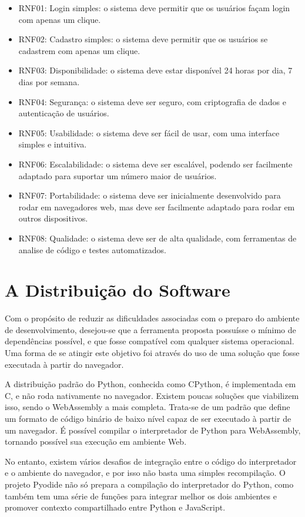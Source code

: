 \begin{itemize}
    \item RNF01: Login simples: o sistema deve permitir que os usuários façam login com apenas um clique.
    \item RNF02: Cadastro simples: o sistema deve permitir que os usuários se cadastrem com apenas um clique.
    \item RNF03: Disponibilidade: o sistema deve estar disponível 24 horas por dia, 7 dias por semana.
    \item RNF04: Segurança: o sistema deve ser seguro, com criptografia de dados e autenticação de usuários.
    \item RNF05: Usabilidade: o sistema deve ser fácil de usar, com uma interface simples e intuitiva.
    \item RNF06: Escalabilidade: o sistema deve ser escalável, podendo ser facilmente adaptado para suportar um número maior de usuários.
    \item RNF07: Portabilidade: o sistema deve ser inicialmente desenvolvido para rodar em navegadores web, mas deve ser facilmente adaptado para rodar em outros dispositivos.
    \item RNF08: Qualidade: o sistema deve ser de alta qualidade, com ferramentas de analise de código e testes automatizados.
\end{itemize}

\section{A Distribuição do Software}

Com o propósito de reduzir as dificuldades associadas com o preparo do ambiente de desenvolvimento, desejou-se que a ferramenta proposta possuísse o mínimo de dependências possível, e que fosse compatível com qualquer sistema operacional. Uma forma de se atingir este objetivo foi através do uso de uma solução que fosse executada à partir do navegador.

A distribuição padrão do Python, conhecida como CPython, é implementada em C, e não roda nativamente no navegador. Existem poucas soluções que viabilizem isso, sendo o WebAssembly a mais completa. Trata-se de um padrão que define um formato de código binário de baixo nível capaz de ser executado à partir de um navegador. É possível compilar o interpretador de Python para WebAssembly, tornando possível sua execução em ambiente Web.

No entanto, existem vários desafios de integração entre o código do interpretador e o ambiente do navegador, e por isso não basta uma simples recompilação. O projeto Pyodide não só prepara a compilação do interpretador do Python, como também tem uma série de funções para integrar melhor os dois ambientes e promover contexto compartilhado entre Python e JavaScript.

